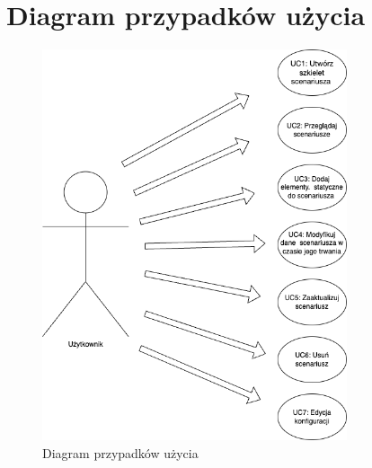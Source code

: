 \section{Diagram przypadków użycia}
\begin{figure}[h!]
    \centering
    \includegraphics[width=0.8\textwidth]{resources/local/use-case-diagram.png}
    \caption{Diagram przypadków użycia}
    \label{fig:use_case_diagram}
\end{figure}

